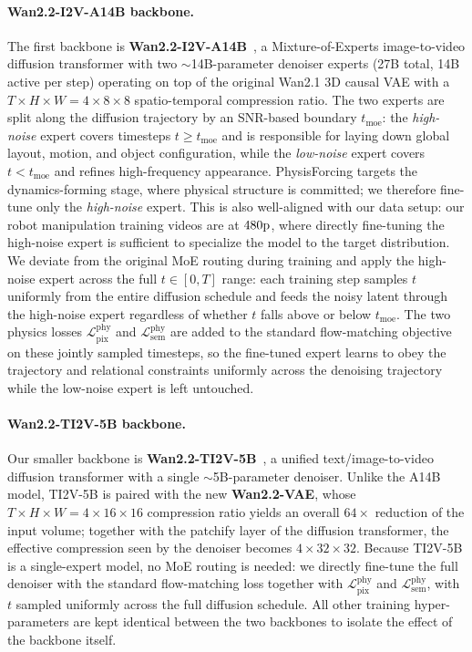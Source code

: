 \paragraph{Wan2.2-I2V-A14B backbone.}
The first backbone is \textbf{Wan2.2-I2V-A14B}~\cite{wan2025wan}, a Mixture-of-Experts image-to-video
diffusion transformer with two $\sim$14B-parameter denoiser experts (27B total, 14B
active per step) operating on top of the original Wan2.1 3D causal VAE with a
$T{\times}H{\times}W = 4{\times}8{\times}8$ spatio-temporal compression ratio. The two
experts are split along the diffusion trajectory by an SNR-based boundary $t_{\mathrm{moe}}$:
the \emph{high-noise} expert covers timesteps $t \geq t_{\mathrm{moe}}$ and is responsible
for laying down global layout, motion, and object configuration, while the
\emph{low-noise} expert covers $t < t_{\mathrm{moe}}$ and refines high-frequency
appearance. PhysisForcing targets the dynamics-forming stage, where physical structure
is committed; we therefore fine-tune only the \emph{high-noise} expert. This is also
well-aligned with our data setup: our robot manipulation training videos are at
$480{\rm p}$, where directly fine-tuning the high-noise expert is sufficient to
specialize the model to the target distribution. We deviate
from the original MoE routing during training and apply the high-noise expert across the
full $t \in [0, T]$ range: each training step samples $t$ uniformly from the entire
diffusion schedule and feeds the noisy latent through the high-noise expert regardless of
whether $t$ falls above or below $t_{\mathrm{moe}}$. The two physics losses
$\mathcal{L}^{\mathrm{phy}}_{\mathrm{pix}}$ and $\mathcal{L}^{\mathrm{phy}}_{\mathrm{sem}}$
are added to the standard flow-matching objective on these jointly sampled timesteps, so
the fine-tuned expert learns to obey the trajectory and relational constraints uniformly
across the denoising trajectory while the low-noise expert is left untouched.

\paragraph{Wan2.2-TI2V-5B backbone.}
Our smaller backbone is \textbf{Wan2.2-TI2V-5B}~\cite{wan2025wan}, a unified text/image-to-video diffusion
transformer with a single $\sim$5B-parameter denoiser. Unlike the A14B model, TI2V-5B is
paired with the new \textbf{Wan2.2-VAE}, whose $T{\times}H{\times}W = 4{\times}16{\times}16$
compression ratio yields an overall $64{\times}$ reduction of the input volume; together
with the patchify layer of the diffusion transformer, the effective compression seen by
the denoiser becomes $4{\times}32{\times}32$. Because TI2V-5B is a single-expert model, no MoE routing is needed: we
directly fine-tune the full denoiser with the standard flow-matching loss together with
$\mathcal{L}^{\mathrm{phy}}_{\mathrm{pix}}$ and $\mathcal{L}^{\mathrm{phy}}_{\mathrm{sem}}$,
with $t$ sampled uniformly across the full diffusion schedule. All other training
hyper-parameters are kept identical between the two backbones to isolate the effect of the backbone itself.

